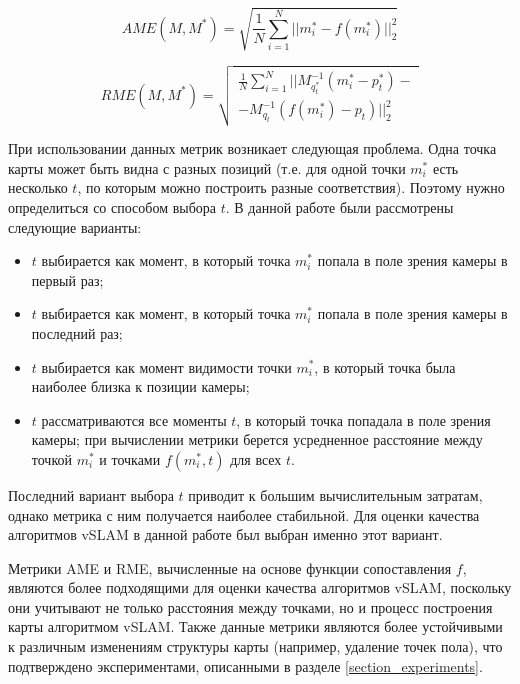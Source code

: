 \documentclass{mipt-thesis-ms}
\begin{document}
	\begin{equation}
		\label{eq_ame_our}
		AME(M, M^*) = \sqrt{\frac{1}{N} \sum\limits_{i=1}^N ||m_i^* - f(m_i^*)||_2^2}
	\end{equation}
	
	\begin{equation}
	\label{eq_rme_our}
	RME(M, M^*) = \sqrt{
	\begin{aligned}
	\frac{1}{N} \sum\limits_{i=1}^N ||M_{q_t^*}^{-1}(m_i^* - p_t^*) - \\
		- M_{q_t}^{-1} (f(m_i^*) - p_t)||_2^2
	\end{aligned}
	}
	\end{equation}
	
	При использовании данных метрик возникает следующая проблема. Одна точка карты может быть видна с разных позиций (т.е. для одной точки $m_i^*$ есть несколько $t$, по которым можно построить разные соответствия). Поэтому нужно определиться со способом выбора $t$. В данной работе были рассмотрены следующие варианты:
	
	\begin{itemize}
		\item $t$ выбирается как момент, в который точка $m_i^*$ попала в поле зрения камеры в первый раз;
		\item $t$ выбирается как момент, в который точка $m_i^*$ попала в поле зрения камеры в последний раз;
		\item $t$ выбирается как момент видимости точки $m_i^*$, в который точка была наиболее близка к позиции камеры;
		\item $t$ рассматриваются все моменты $t$, в который точка попадала в поле зрения камеры; при вычислении метрики берется усредненное расстояние между точкой $m_i^*$ и точками $f(m_i^*, t)$ для всех $t$.
	\end{itemize}

	Последний вариант выбора $t$ приводит к большим вычислительным затратам, однако метрика с ним получается наиболее стабильной. Для оценки качества алгоритмов vSLAM в данной работе был выбран именно этот вариант.
	
	Метрики AME и RME, вычисленные на основе функции сопоставления $f$, являются более подходящими для оценки качества алгоритмов vSLAM, поскольку они учитывают не только расстояния между точками, но и процесс построения карты алгоритмом vSLAM. Также данные метрики являются более устойчивыми к различным изменениям структуры карты (например, удаление точек пола), что подтверждено экспериментами, описанными в разделе \ref{section_experiments}.
	
\end{document}

